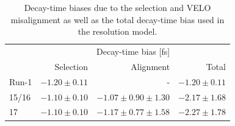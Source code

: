 \begin{table}[h]
\centering
\caption{Decay-time biases due to the selection and VELO misalignment as well as the total decay-time bias used in the resolution model. }
 \renewcommand{\arraystretch}{1.}
  \begin{tabular}{ l  r r r } 
  \hline 
  \hline
 &  &  Decay-time bias [fs]   &  \\
 & Selection & Alignment   & Total \\
  \hline			
  Run-1 &   $-1.20 \pm 0.11$ & - &  $-1.20 \pm 0.11$ \\
  15/16 &  $-1.10 \pm 0.10$ & $-1.07 \pm 0.90  \pm 1.30$ & $-2.17 \pm 1.68$   \\
  17 &   $-1.10 \pm 0.10$ & $-1.17 \pm 0.77 \pm 1.58$ & $-2.27 \pm 1.78$ \\
  \hline  
 \hline   
\end{tabular}
\label{table:bias}
\end{table}

